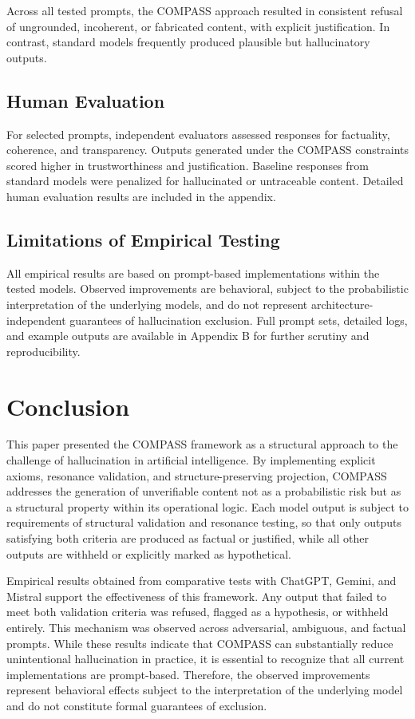 \documentclass[11pt,a4paper]{article}
\begin{document}
Across all tested prompts, the COMPASS approach resulted in consistent refusal of ungrounded, incoherent, or fabricated content, with explicit justification. In contrast, standard models frequently produced plausible but hallucinatory outputs.

\subsection{Human Evaluation}

For selected prompts, independent evaluators assessed responses for factuality, coherence, and transparency. Outputs generated under the COMPASS constraints scored higher in trustworthiness and justification. Baseline responses from standard models were penalized for hallucinated or untraceable content. Detailed human evaluation results are included in the appendix.

\subsection{Limitations of Empirical Testing}

All empirical results are based on prompt-based implementations within the tested models. Observed improvements are behavioral, subject to the probabilistic interpretation of the underlying models, and do not represent architecture-independent guarantees of hallucination exclusion. Full prompt sets, detailed logs, and example outputs are available in Appendix B for further scrutiny and reproducibility.

\section{Conclusion}

This paper presented the COMPASS framework as a structural approach to the challenge of hallucination in artificial intelligence. By implementing explicit axioms, resonance validation, and structure-preserving projection, COMPASS addresses the generation of unverifiable content not as a probabilistic risk but as a structural property within its operational logic. Each model output is subject to requirements of structural validation and resonance testing, so that only outputs satisfying both criteria are produced as factual or justified, while all other outputs are withheld or explicitly marked as hypothetical.

Empirical results obtained from comparative tests with ChatGPT, Gemini, and Mistral support the effectiveness of this framework. Any output that failed to meet both validation criteria was refused, flagged as a hypothesis, or withheld entirely. This mechanism was observed across adversarial, ambiguous, and factual prompts. While these results indicate that COMPASS can substantially reduce unintentional hallucination in practice, it is essential to recognize that all current implementations are prompt-based. Therefore, the observed improvements represent behavioral effects subject to the interpretation of the underlying model and do not constitute formal guarantees of exclusion.
\end{document}
